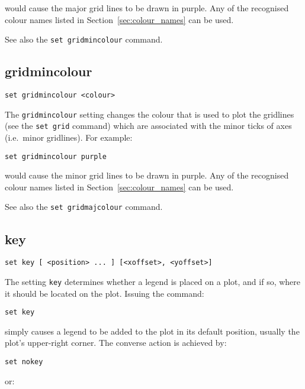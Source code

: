 \noindent would cause the major grid lines to be drawn in purple. Any of the recognised
colour names listed in Section~\ref{sec:colour_names} can be used.

See also the {\tt set gridmincolour} command.


\subsection{gridmincolour}

\begin{verbatim}
set gridmincolour <colour>
\end{verbatim}

The {\tt gridmincolour} setting changes the colour that is used to plot the
gridlines (see the {\tt set grid} command) which are associated with the minor
ticks of axes (i.e.\ minor gridlines). For example:

\begin{verbatim}
set gridmincolour purple
\end{verbatim}

\noindent would cause the minor grid lines to be drawn in purple. Any of the recognised
colour names listed in Section~\ref{sec:colour_names} can be used.

See also the {\tt set gridmajcolour} command.

\subsection{key}

\begin{verbatim}
set key [ <position> ... ] [<xoffset>, <yoffset>]
\end{verbatim}

The setting {\tt key} determines whether a legend is placed on a plot, and if
so, where it should be located on the plot. Issuing the command:

\begin{verbatim}
set key
\end{verbatim}

\noindent simply causes a legend to be added to the plot in its default position, usually
the plot's upper-right corner. The converse action is achieved by:

\begin{verbatim}
set nokey
\end{verbatim}

\noindent or:

